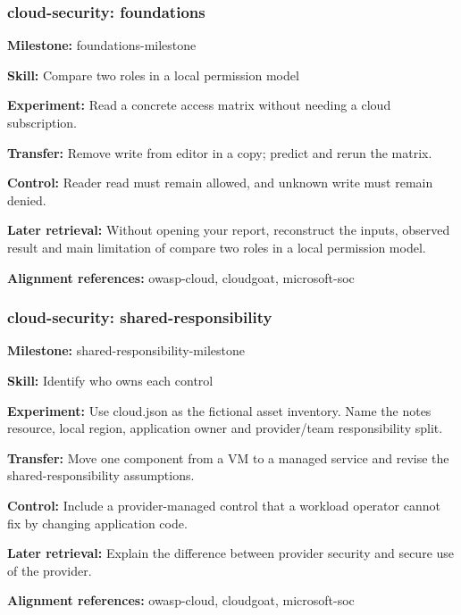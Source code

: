 \subsubsection{cloud-security: foundations}
\noindent\textbf{Milestone:} foundations-milestone\par
\noindent\textbf{Skill:} Compare two roles in a local permission model\par
\noindent\textbf{Experiment:} Read a concrete access matrix without needing a cloud subscription.\par
\noindent\textbf{Transfer:} Remove write from editor in a copy; predict and rerun the matrix.\par
\noindent\textbf{Control:} Reader read must remain allowed, and unknown write must remain denied.\par
\noindent\textbf{Later retrieval:} Without opening your report, reconstruct the inputs, observed result and main limitation of compare two roles in a local permission model.\par
\noindent\textbf{Alignment references:} owasp-cloud, cloudgoat, microsoft-soc\par
\subsubsection{cloud-security: shared-responsibility}
\noindent\textbf{Milestone:} shared-responsibility-milestone\par
\noindent\textbf{Skill:} Identify who owns each control\par
\noindent\textbf{Experiment:} Use cloud.json as the fictional asset inventory. Name the notes resource, local region, application owner and provider/team responsibility split.\par
\noindent\textbf{Transfer:} Move one component from a VM to a managed service and revise the shared-responsibility assumptions.\par
\noindent\textbf{Control:} Include a provider-managed control that a workload operator cannot fix by changing application code.\par
\noindent\textbf{Later retrieval:} Explain the difference between provider security and secure use of the provider.\par
\noindent\textbf{Alignment references:} owasp-cloud, cloudgoat, microsoft-soc\par

